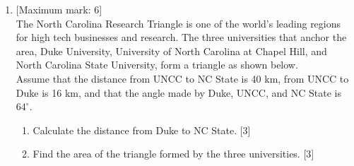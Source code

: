 \documentclass[12pt, twoside]{article}
\begin{document}
\begin{enumerate}
\newpage
    \item  {[Maximum mark: 6]} \\[0.3cm]
        The North Carolina Research Triangle is one of the world's leading regions for high tech businesses and research. The three universities that anchor the area, Duke University, University of North Carolina at Chapel Hill, and North Carolina State University, form a triangle as shown below. \\[0.25cm]
        Assume that the distance from UNCC to NC State is 40 km, from UNCC to Duke is 16 km, and that the angle made by Duke, UNCC, and NC State is $64^\circ$.
        \begin{center}
        \end{center} 
        \begin{enumerate}
            \item Calculate the distance from Duke to NC State. \hfill [3]
            \item Find the area of the triangle formed by the three universities. \hfill [3]
        \end{enumerate}


\end{enumerate}
\end{document}
